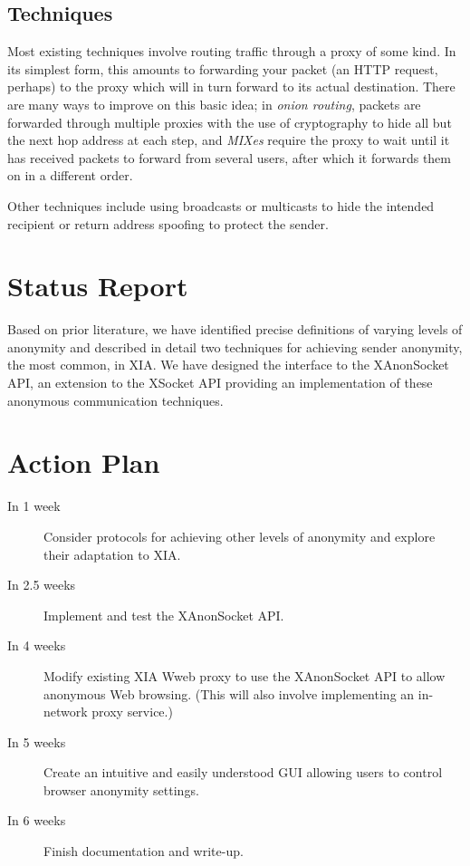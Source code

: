 \documentclass[11pt]{article}
\begin{document}
\subsection{Techniques}
Most existing techniques involve routing traffic through a proxy of some kind. In its simplest form, this amounts to forwarding your packet (an HTTP request, perhaps) to the proxy which will in turn forward to its actual destination. There are many ways to improve on this basic idea; in \emph{onion routing}, packets are forwarded through multiple proxies with the use of cryptography to hide all but the next hop address at each step, and \emph{MIXes} \cite{Chaum81} require the proxy to wait until it has received packets to forward from several users, after which it forwards them on in a different order.

Other techniques include using broadcasts or multicasts to hide the intended recipient or return address spoofing to protect the sender.


\section{Status Report}
Based on prior literature, we have identified precise definitions of varying levels of anonymity and described in detail two techniques for achieving sender anonymity, the most common, in XIA. We have designed the interface to the XAnonSocket API, an extension to the XSocket API providing an implementation of these anonymous communication techniques.

\section{Action Plan}
\begin{description}
\item[In 1 week] Consider protocols for achieving other levels of anonymity and explore their adaptation to XIA.
\item[In 2.5 weeks] Implement and test the XAnonSocket API.
\item[In 4 weeks] Modify existing XIA Wweb proxy to use the XAnonSocket API to allow anonymous Web browsing. (This will also involve implementing an in-network proxy service.)
\item[In 5 weeks] Create an intuitive and easily understood GUI allowing users to control browser anonymity settings.
\item[In 6 weeks] Finish documentation and write-up.
\end{description}
\end{document}
